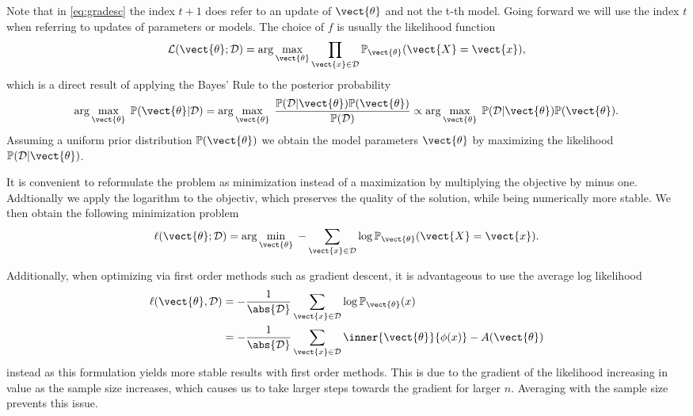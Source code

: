     Note that in \eq\ref{eq:gradesc} the index $t+1$ does refer to an update of $\vect{\theta}$ and not the t-th model.
    Going forward we will use the index $t$ when referring to updates of parameters or models. 
    The choice of $f$ is usually the likelihood function
    \begin{equation}
        \label{eq:likelihood}
        \mathcal{L}(\vect{\theta} ; \mathcal{D}) = \arg\max_{\vect{\theta}}\prod_{\vect{x} \in \mathcal{D}}  \mathbb{P}_{\vect{\theta}}(\vect{X} = \vect{x}),
    \end{equation}
    which is a direct result of applying the Bayes' Rule to the posterior probability
    \begin{equation}
        \arg\max_{\vect{\theta}} \; \mathbb{P}(\vect{\theta} \lvert \mathcal{D}) = \arg\max_{\vect{\theta}} \; \frac{\mathbb{P}(\mathcal{D} \lvert \vect{\theta}) \mathbb{P}(\vect{\theta})}{\mathbb{P}(\mathcal{D})} \propto   \arg\max_{\vect{\theta}} \; \mathbb{P}(\mathcal{D} \lvert \vect{\theta}) \mathbb{P}(\vect{\theta}).
    \end{equation}
    Assuming a uniform prior distribution $\mathbb{P}(\vect{\theta})$ we obtain the model parameters $\vect{\theta}$ by maximizing the likelihood $\mathbb{P}(\mathcal{D} \lvert \vect{\theta})$.

    It is convenient to reformulate the problem as minimization instead of a maximization by multiplying the objective by minus one. 
    Addtionally we apply the logarithm to the objectiv, which preserves the quality of the solution, while being numerically more stable.
    We then obtain the following minimization problem
    \begin{equation}
        \label{eq:likelihood:log}
        \ell(\vect{\theta} ; \mathcal{D}) = \arg\min_{\vect{\theta}} \; - \sum_{\vect{x} \in \mathcal{D}}  \log \mathbb{P}_{\vect{\theta}}(\vect{X} = \vect{x}).
    \end{equation}

    Additionally, when optimizing via first order methods such as gradient descent, it is advantageous to use the average log likelihood
    \begin{equation}
        \label{eq:likelihood:expfam}
        \begin{split}
        \ell(\vect{\theta}, \mathcal{D}) &= - \frac{1}{\abs{\mathcal{D}}} \sum_{\vect{x} \in \mathcal{D}} \log \mathbb{P}_{\vect{\theta}}(x)\\
        &= - \frac{1}{\abs{\mathcal{D}}} \sum_{\vect{x} \in \mathcal{D}} \inner{\vect{\theta}}{\phi(x)} - A(\vect{\theta})
    \end{split}
    \end{equation}
    instead as this formulation yields more stable results with first order methods.
    This is due to the gradient of the likelihood increasing in value as the sample size increases, which causes us to take larger steps towards the gradient for larger $n$.
    Averaging with the sample size prevents this issue.

